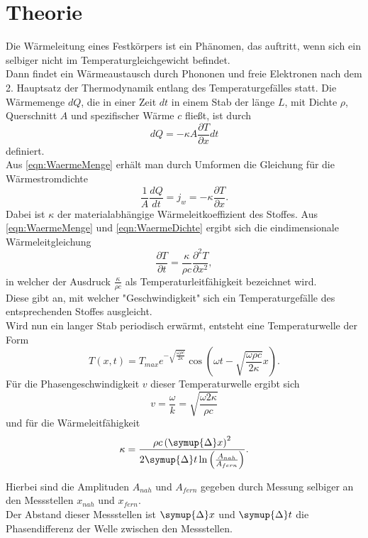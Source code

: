 \section{Theorie}
\label{sec:Theorie}

Die Wärmeleitung eines Festkörpers ist ein Phänomen, das auftritt, wenn sich ein selbiger nicht im Temperaturgleichgewicht
befindet. \\
Dann findet ein Wärmeaustausch durch Phononen und freie Elektronen nach dem 2. Hauptsatz der Thermodynamik entlang des Temperaturgefälles statt.
Die Wärmemenge $dQ$, die in einer Zeit $dt$ in einem Stab der länge $L$, mit Dichte $\rho$, Querschnitt $A$ und spezifischer Wärme $c$ fließt, ist durch
\begin{equation}
    \label{eqn:WaermeMenge}
    dQ = -\kappa A\frac{\partial T}{\partial x}dt
\end{equation}
definiert.\\
Aus \eqref{eqn:WaermeMenge} erhält man durch Umformen die Gleichung für die Wärmestromdichte
\begin{equation}
    \label{eqn:WaermeDichte}
    \frac{1}{A}\frac{dQ}{dt} = j_w = -\kappa \frac{\partial T}{\partial x}.
\end{equation}
Dabei ist $\kappa$ der materialabhängige Wärmeleitkoeffizient des Stoffes.
Aus \eqref{eqn:WaermeMenge} und \eqref{eqn:WaermeDichte} ergibt sich die eindimensionale Wärmeleitgleichung
\begin{equation}
    \frac{\partial T}{\partial t} = \frac{\kappa}{\rho c}\frac{\partial^2 T}{\partial x^2},
\end{equation}
in welcher der Ausdruck $\frac{\kappa}{\rho c}$ als Temperaturleitfähigkeit bezeichnet wird. \\
Diese gibt an, mit welcher "Geschwindigkeit" sich ein Temperaturgefälle des entsprechenden Stoffes ausgleicht.
\\
Wird nun ein langer Stab periodisch erwärmt, entsteht eine Temperaturwelle der Form
\begin{equation}
    T\left(x,t\right) = T_{max}e^{-\sqrt{\frac{\omega \rho c}{2\kappa}}}\cos\left(\omega t - \sqrt{\frac{\omega \rho c}{2\kappa}}x\right).
\end{equation}
Für die Phasengeschwindigkeit $v$ dieser Temperaturwelle ergibt sich
\begin{equation}
    v = \frac{\omega}{k} = \sqrt{\frac{\omega 2 \kappa}{\rho c}}
\end{equation}
und für die Wärmeleitfähigkeit
\begin{equation}
    \label{eqn:kappa}
    \kappa = \frac{\rho c \left(\symup{\Delta}x\right)^2}{2\symup{\Delta}t\ln\left(\frac{A_{nah}}{A_{fern}}\right)}.
\end{equation}

Hierbei sind die Amplituden $A_{nah}$ und $A_{fern}$ gegeben durch Messung selbiger an den Messstellen $x_{nah}$ und $x_{fern}$.\\
Der Abstand dieser Messstellen ist $\symup{\Delta}x$ und $\symup{\Delta}t$ die Phasendifferenz der Welle zwischen den Messstellen.